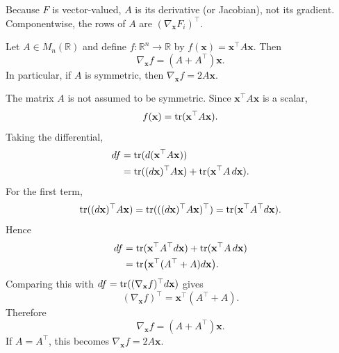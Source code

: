 \begin{remark}
Because $F$ is vector-valued, $A$ is its derivative (or Jacobian), not its
gradient. Componentwise, the rows of $A$ are
$(\nabla_{\mathbf{x}}F_i)^{\top}$.
\end{remark}


\begin{theorem}
Let $A\in M_n(\mathbb{R})$ and define $f:\mathbb{R}^n\to\mathbb{R}$ by
$f(\mathbf{x})=\mathbf{x}^{\top} A\mathbf{x}$. Then
\[
    \nabla_{\mathbf{x}} f=(A+A^{\top})\mathbf{x}.
\]
In particular, if $A$ is symmetric, then $\nabla_{\mathbf{x}} f=2A\mathbf{x}$.
\end{theorem}

\begin{pfbox}
The matrix $A$ is not assumed to be symmetric. Since $\mathbf{x}^{\top} A\mathbf{x}$ is a scalar,
\[
    f(\mathbf{x})=\operatorname{tr}(\mathbf{x}^{\top} A\mathbf{x}).
\]
Taking the differential,
\[
\begin{aligned}
    df
    &=
    \operatorname{tr}(d(\mathbf{x}^{\top} A\mathbf{x}))\\
    &=
    \operatorname{tr}((d\mathbf{x})^{\top} A\mathbf{x})+\operatorname{tr}(\mathbf{x}^{\top} A\,d\mathbf{x}).
\end{aligned}
\]
For the first term,
\[
    \operatorname{tr}((d\mathbf{x})^{\top} A\mathbf{x})
    =
    \operatorname{tr}(((d\mathbf{x})^{\top} A\mathbf{x})^{\top})
    =
    \operatorname{tr}(\mathbf{x}^{\top} A^{\top} d\mathbf{x}).
\]
Hence
\[
\begin{aligned}
    df
    &=
    \operatorname{tr}(\mathbf{x}^{\top} A^{\top} d\mathbf{x})+\operatorname{tr}(\mathbf{x}^{\top} A\,d\mathbf{x})\\
    &=
    \operatorname{tr}\bigl(\mathbf{x}^{\top}(A^{\top}+A)d\mathbf{x}\bigr).
\end{aligned}
\]
Comparing this with $df=\operatorname{tr}((\nabla_{\mathbf{x}} f)^{\top} d\mathbf{x})$ gives
\[
    (\nabla_{\mathbf{x}} f)^{\top}=\mathbf{x}^{\top}(A^{\top}+A).
\]
Therefore
\[
    \nabla_{\mathbf{x}} f=(A+A^{\top})\mathbf{x}.
\]
If $A=A^{\top}$, this becomes $\nabla_{\mathbf{x}} f=2A\mathbf{x}$.
\end{pfbox}



